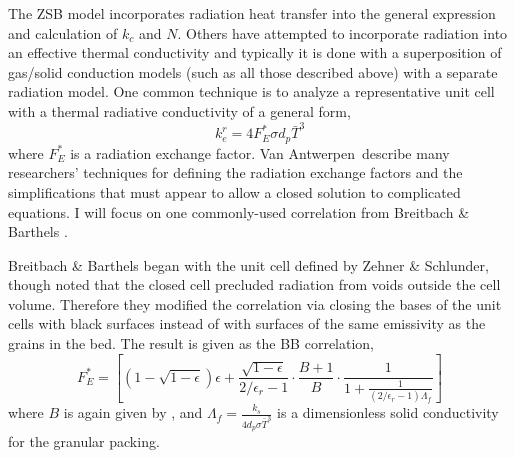 The ZSB model incorporates radiation heat transfer into the general expression and calculation of $k_c$ and $N$. Others have attempted to incorporate radiation into an effective thermal conductivity and typically it is done with a superposition of gas/solid conduction models (such as all those described above) with a separate radiation model. One common technique is to analyze a representative unit cell with a thermal radiative conductivity of a general form,
\begin{equation}
     k_e^r = 4 F_E^*\sigma d_p \bar{T}^3
\end{equation} 
where $F_E^*$ is a radiation exchange factor. Van Antwerpen\etal~describe many researchers' techniques for defining the radiation exchange factors and the simplifications that must appear to allow a closed solution to complicated equations. I will focus on one commonly-used correlation from Breitbach \& Barthels \cite{breitbach1980radiant}.

Breitbach \& Barthels began with the unit cell defined by Zehner \& Schlunder, though noted that the closed cell precluded radiation from voids outside the cell volume. Therefore they modified the correlation via closing the bases of the unit cells with black surfaces instead of with surfaces of the same emissivity as the grains in the bed. The result is given as the BB correlation,\cite{breitbach1980radiant}
\begin{equation}
    F_E^* = \left[\left(1-\sqrt{1-\epsilon}\right)\epsilon + \frac{\sqrt{1-\epsilon}}{2/\epsilon_r - 1}\cdot\frac{B+1}{B}\cdot\frac{1}{1+\frac{1}{(2/\epsilon_r - 1)\Lambda_f}} \right]
\end{equation}
where $B$ is again given by , and $\Lambda_f = \frac{k_s}{4d_p\sigma\bar{T}^3}$ is a dimensionless solid conductivity for the granular packing.


